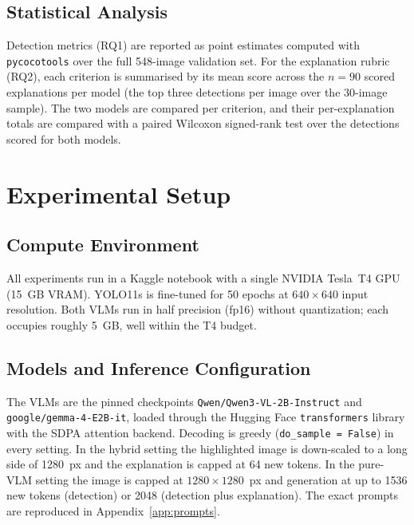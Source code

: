 \documentclass[acmtog, authorversion]{acmart}
\begin{document}
\subsection{Statistical Analysis}
Detection metrics (RQ1) are reported as point estimates computed with
\texttt{pycocotools} over the full 548-image validation set. For the
explanation rubric (RQ2), each criterion is summarised by its mean
score across the $n = 90$ scored explanations per model (the top three
detections per image over the 30-image sample). The two models are
compared per criterion, and their per-explanation totals are compared
with a paired Wilcoxon signed-rank test over the detections scored for
both models.

\section{Experimental Setup}
\label{sec:setup}

\subsection{Compute Environment}
All experiments run in a Kaggle notebook with a single NVIDIA Tesla~T4
GPU (15~GB VRAM). YOLO11s is fine-tuned for 50 epochs at
$640\times640$ input resolution. Both VLMs run in half precision
(fp16) without quantization; each occupies roughly 5~GB, well within
the T4 budget.

\subsection{Models and Inference Configuration}
The VLMs are the pinned checkpoints \texttt{Qwen/Qwen3-VL-2B-Instruct}
and \texttt{google/gemma-4-E2B-it}, loaded through the Hugging Face
\texttt{transformers} library with the SDPA attention backend.
Decoding is greedy (\texttt{do\_sample = False}) in every setting. In
the hybrid setting the highlighted image is down-scaled to a long side
of 1280~px and the explanation is capped at 64 new tokens. In the
pure-VLM setting the image is capped at $1280\times1280$~px and
generation at up to 1536 new tokens (detection) or 2048 (detection
plus explanation). The exact prompts are reproduced in
Appendix~\ref{app:prompts}.
\end{document}
